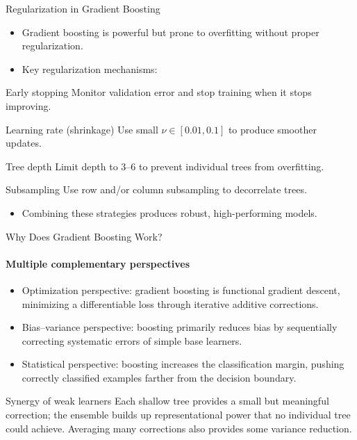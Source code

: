 \begin{frame}{Regularization in Gradient Boosting}
  \begin{itemize}
    \item Gradient boosting is powerful but prone to overfitting without proper regularization.
    \item Key regularization mechanisms:
  \end{itemize}
  \begin{block}{Early stopping}
    Monitor validation error and stop training when it stops improving.
  \end{block}
  \begin{block}{Learning rate (shrinkage)}
    Use small $\nu \in [0.01, 0.1]$ to produce smoother updates.
  \end{block}
  \begin{block}{Tree depth}
    Limit depth to 3--6 to prevent individual trees from overfitting.
  \end{block}
  \begin{block}{Subsampling}
    Use row and/or column subsampling to decorrelate trees.
  \end{block}
  \begin{itemize}
    \item Combining these strategies produces robust, high-performing models.
  \end{itemize}
\end{frame}

\begin{frame}{Why Does Gradient Boosting Work?}
  \framesubtitle{Multiple complementary perspectives}
  \begin{itemize}
    \item \alert{Optimization perspective}: gradient boosting is functional gradient descent,
          minimizing a differentiable loss through iterative additive corrections.
    \item \alert{Bias--variance perspective}: boosting primarily reduces \alert{bias} by
          sequentially correcting systematic errors of simple base learners.
    \item \alert{Statistical perspective}: boosting increases the \alert{classification margin},
          pushing correctly classified examples farther from the decision boundary.
  \end{itemize}
  \begin{block}{Synergy of weak learners}
    Each shallow tree provides a small but meaningful correction; the ensemble builds up
    representational power that no individual tree could achieve. Averaging many corrections
    also provides some variance reduction.
  \end{block}
\end{frame}

